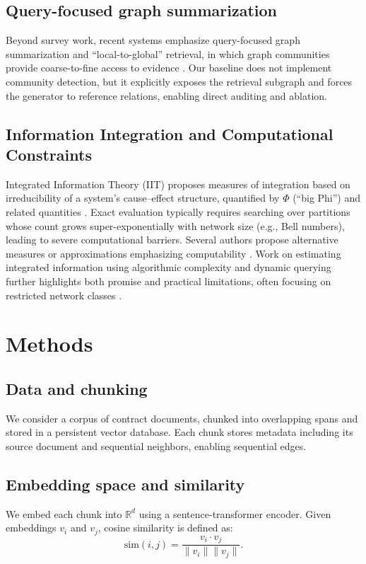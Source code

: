 \documentclass[11pt]{article}
\begin{document}
\subsection{Query-focused graph summarization}
Beyond survey work, recent systems emphasize query-focused graph summarization and ``local-to-global'' retrieval, in which graph communities provide coarse-to-fine access to evidence \citep{edge2024localglobal}. Our baseline does not implement community detection, but it explicitly exposes the retrieval subgraph and forces the generator to reference relations, enabling direct auditing and ablation.

\subsection{Information Integration and Computational Constraints}
Integrated Information Theory (IIT) proposes measures of integration based on irreducibility of a system's cause--effect structure, quantified by $\Phi$ (``big Phi'') and related quantities \citep{tononi2004iit,oizumi2014iit3}. Exact evaluation typically requires searching over partitions whose count grows super-exponentially with network size (e.g., Bell numbers), leading to severe computational barriers. Several authors propose alternative measures or approximations emphasizing computability \citep{tegmark2016iit}. Work on estimating integrated information using algorithmic complexity and dynamic querying further highlights both promise and practical limitations, often focusing on restricted network classes \citep{hernandez2021estimations}.

\section{Methods}
\subsection{Data and chunking}
We consider a corpus of contract documents, chunked into overlapping spans and stored in a persistent vector database. Each chunk stores metadata including its source document and sequential neighbors, enabling sequential edges.

\subsection{Embedding space and similarity}
We embed each chunk into $\mathbb{R}^d$ using a sentence-transformer encoder. Given embeddings $v_i$ and $v_j$, cosine similarity is defined as:
\begin{equation}
\mathrm{sim}(i,j) = \frac{v_i \cdot v_j}{\lVert v_i\rVert \lVert v_j\rVert}.
\end{equation}
\end{document}
